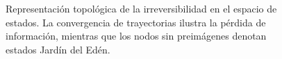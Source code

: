 \begin{figure}[h]
\centering
\caption{Representación topológica de la irreversibilidad en el espacio de estados. La convergencia de trayectorias ilustra la pérdida de información, mientras que los nodos sin preimágenes denotan estados Jardín del Edén.}
\label{fig:jardin_eden}
\end{figure}
